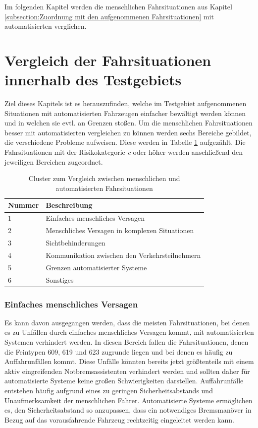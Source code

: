 Im folgenden Kapitel werden die menschlichen Fahrsituationen aus Kapitel \ref{subsection:Zuordnung mit den aufgenommenen Fahrsituationen} mit automatisierten verglichen. 

\section{Vergleich der Fahrsituationen innerhalb des Testgebiets}\label{section:Fahrsituationen im Vergleich}
Ziel dieses Kapitels ist es herauszufinden, welche im Testgebiet aufgenommenen Situationen  mit automatisierten Fahrzeugen einfacher bewältigt werden können und in welchen sie evtl. an Grenzen stoßen.
Um die menschlichen Fahrsituationen besser mit automatisierten vergleichen zu können werden sechs Bereiche gebildet, die verschiedene Probleme aufweisen. Diese werden in Tabelle \ref{tab:Cluster} aufgezählt. Die Fahrsituationen mit der Risikokategorie \textit{c} oder höher werden anschließend den jeweiligen Bereichen zugeordnet. 

\begin{table}[htpb]
	\scriptsize
	\caption[Cluster zum Vergleich zwischen menschlichen und automatisierten Fahrsituationen]{Cluster zum Vergleich zwischen menschlichen und automatisierten Fahrsituationen}\label{tab:Cluster}
	\centering
	\begin{tabular}{l l}
		\toprule
		Nummer & Beschreibung \\
		\midrule
		1 & Einfaches menschliches Versagen \\
		2 & Menschliches Versagen in komplexen Situationen \\
		3 & Sichtbehinderungen \\
		4 & Kommunikation zwischen den Verkehrsteilnehmern \\
		5 & Grenzen automatisierter Systeme \\
		6 & Sonstiges \\		 
		\bottomrule
	\end{tabular}
\end{table}

\subsubsection{Einfaches menschliches Versagen}
Es kann davon ausgegangen werden, dass die meisten Fahrsituationen, bei denen es zu Unfällen durch einfaches menschliches Versagen kommt, mit automatisierten Systemen verhindert werden. In diesen Bereich fallen die Fahrsituationen, denen die Feintypen 609, 619 und 623 zugrunde liegen und bei denen es häufig zu Auffahrunfällen kommt. Diese Unfälle könnten bereits jetzt größtenteils mit einem aktiv eingreifenden Notbremsassistenten verhindert werden und sollten daher für automatisierte Systeme keine großen Schwierigkeiten darstellen. Auffahrunfälle entstehen häufig aufgrund eines zu geringen Sicherheitsabstands und Unaufmerksamkeit der menschlichen Fahrer. Automatisierte Systeme ermöglichen es, den Sicherheitsabstand so anzupassen, dass ein notwendiges Bremsmanöver in Bezug auf das vorausfahrende Fahrzeug rechtzeitig eingeleitet werden kann.

